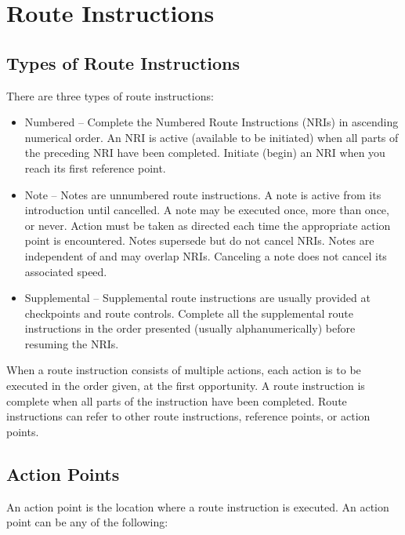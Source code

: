 \section{Route Instructions}

\subsection{Types of Route Instructions}
There are three types of route instructions:

\begin{itemize}

\item Numbered -- Complete the Numbered Route Instructions (NRIs) in ascending numerical order.  An NRI is active (available to be initiated) when all parts of the preceding NRI have been completed.  Initiate (begin) an NRI when you reach its first reference point.

\item Note -- Notes are unnumbered route instructions.  A note is active from its introduction until cancelled.  A note may be executed once, more than once, or never.  Action must be taken as directed each time the appropriate action point is encountered.  Notes supersede but do not cancel NRIs.  Notes are independent of and may overlap NRIs.  Canceling a note does not cancel its associated speed.

\item Supplemental -- Supplemental route instructions are usually provided at checkpoints and route controls.  Complete all the supplemental route instructions in the order presented (usually alphanumerically) before resuming the NRIs.

\end{itemize}

When a route instruction consists of multiple actions, each action is to be executed in the order given, at the first opportunity.  A route instruction is complete when all parts of the instruction have been completed.  Route instructions can refer to other route instructions, reference points, or action points.

\subsection{Action Points}
An action point is the location where a route instruction is executed.  An action point can be any of the following:

